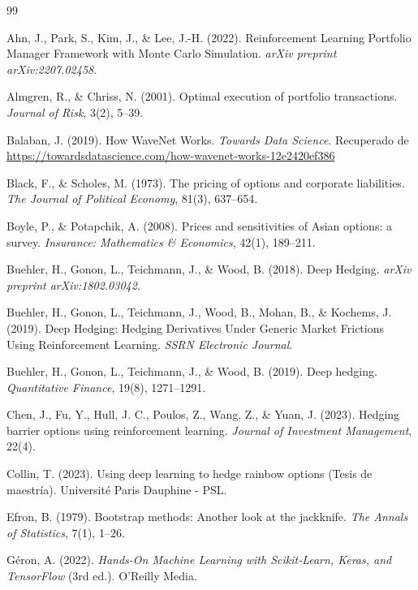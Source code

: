 \documentclass[11pt,a4paper,spanish]{article}
\numberwithin{equation}{section} %
\begin{document}
\newpage

\begin{thebibliography}{99}

 Ahn, J., Park, S., Kim, J., \& Lee, J.-H. (2022). Reinforcement Learning Portfolio Manager Framework with Monte Carlo Simulation. \textit{arXiv preprint arXiv:2207.02458}.

 Almgren, R., \& Chriss, N. (2001). Optimal execution of portfolio transactions. \textit{Journal of Risk}, 3(2), 5–39.

 Balaban, J. (2019). How WaveNet Works. \textit{Towards Data Science}. Recuperado de \url{https://towardsdatascience.com/how-wavenet-works-12e2420ef386}

 Black, F., \& Scholes, M. (1973). The pricing of options and corporate liabilities. \textit{The Journal of Political Economy}, 81(3), 637–654.

 Boyle, P., \& Potapchik, A. (2008). Prices and sensitivities of Asian options: a survey. \textit{Insurance: Mathematics \& Economics}, 42(1), 189–211.

Buehler, H., Gonon, L., Teichmann, J., \& Wood, B. (2018). Deep Hedging. \textit{arXiv preprint arXiv:1802.03042}.

Buehler, H., Gonon, L., Teichmann, J., Wood, B., Mohan, B., \& Kochems, J. (2019). Deep Hedging: Hedging Derivatives Under Generic Market Frictions Using Reinforcement Learning. \textit{SSRN Electronic Journal}.


 Buehler, H., Gonon, L., Teichmann, J., \& Wood, B. (2019). Deep hedging. \textit{Quantitative Finance}, 19(8), 1271–1291.

 Chen, J., Fu, Y., Hull, J. C., Poulos, Z., Wang, Z., \& Yuan, J. (2023). Hedging barrier options using reinforcement learning. \textit{Journal of Investment Management}, 22(4).

 Collin, T. (2023). Using deep learning to hedge rainbow options (Tesis de maestría). Université Paris Dauphine - PSL.

 Efron, B. (1979). Bootstrap methods: Another look at the jackknife. \textit{The Annals of Statistics}, 7(1), 1–26.

 Géron, A. (2022). \textit{Hands-On Machine Learning with Scikit-Learn, Keras, and TensorFlow} (3rd ed.). O'Reilly Media.



\end{thebibliography}
\end{document}
